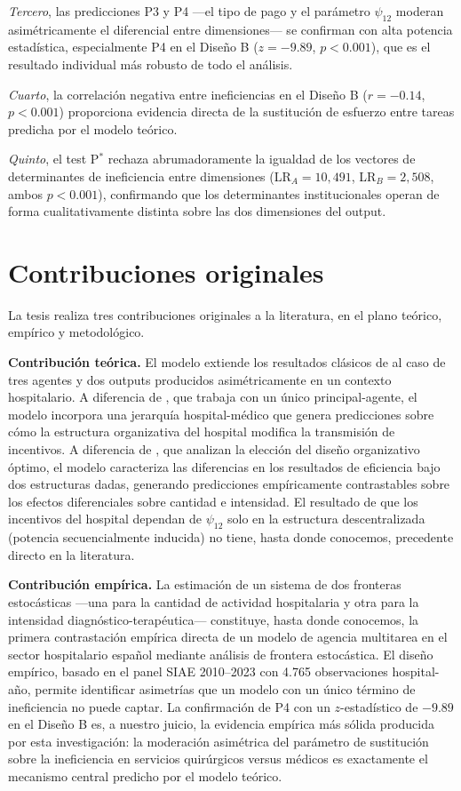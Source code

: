 \textit{Tercero}, las predicciones P3 y P4 ---el tipo de pago y el parámetro $\psi_{12}$ moderan asimétricamente el diferencial entre dimensiones--- se confirman con alta potencia estadística, especialmente P4 en el Diseño B ($z=-9.89$, $p<0.001$), que es el resultado individual más robusto de todo el análisis.

\textit{Cuarto}, la correlación negativa entre ineficiencias en el Diseño B ($r=-0.14$, $p<0.001$) proporciona evidencia directa de la sustitución de esfuerzo entre tareas predicha por el modelo teórico.

\textit{Quinto}, el test P$^*$ rechaza abrumadoramente la igualdad de los vectores de determinantes de ineficiencia entre dimensiones (LR$_A=10{,}491$, LR$_B=2{,}508$, ambos $p<0.001$), confirmando que los determinantes institucionales operan de forma cualitativamente distinta sobre las dos dimensiones del output.

\section{Contribuciones originales}

La tesis realiza tres contribuciones originales a la literatura, en el plano teórico, empírico y metodológico.

\textbf{Contribución teórica.} El modelo extiende los resultados clásicos de \citet{holmstrom1991} al caso de tres agentes y dos outputs producidos asimétricamente en un contexto hospitalario. A diferencia de \citet{holmstrom1991}, que trabaja con un único principal-agente, el modelo incorpora una jerarquía hospital-médico que genera predicciones sobre cómo la estructura organizativa del hospital modifica la transmisión de incentivos. A diferencia de \citet{jelovac2002}, que analizan la elección del diseño organizativo óptimo, el modelo caracteriza las diferencias en los resultados de eficiencia bajo dos estructuras dadas, generando predicciones empíricamente contrastables sobre los efectos diferenciales sobre cantidad e intensidad. El resultado de que los incentivos del hospital dependan de $\psi_{12}$ solo en la estructura descentralizada (potencia secuencialmente inducida) no tiene, hasta donde conocemos, precedente directo en la literatura.

\textbf{Contribución empírica.} La estimación de un sistema de dos fronteras estocásticas ---una para la cantidad de actividad hospitalaria y otra para la intensidad diagnóstico-terapéutica--- constituye, hasta donde conocemos, la primera contrastación empírica directa de un modelo de agencia multitarea en el sector hospitalario español mediante análisis de frontera estocástica. El diseño empírico, basado en el panel SIAE 2010--2023 con 4.765 observaciones hospital-año, permite identificar asimetrías que un modelo con un único término de ineficiencia no puede captar. La confirmación de P4 con un $z$-estadístico de $-9.89$ en el Diseño B es, a nuestro juicio, la evidencia empírica más sólida producida por esta investigación: la moderación asimétrica del parámetro de sustitución sobre la ineficiencia en servicios quirúrgicos versus médicos es exactamente el mecanismo central predicho por el modelo teórico.

